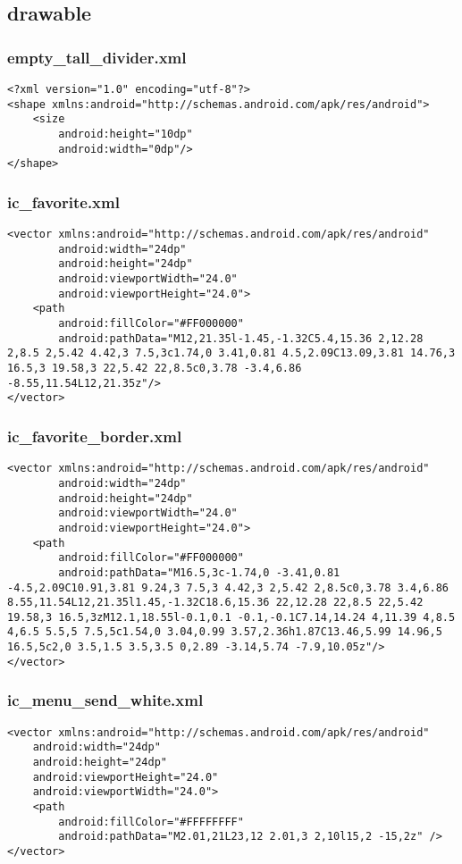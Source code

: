 \subsection*{drawable}
\subsubsection*{empty\_tall\_divider.xml}
\begin{lstlisting}
<?xml version="1.0" encoding="utf-8"?>
<shape xmlns:android="http://schemas.android.com/apk/res/android">
    <size
        android:height="10dp"
        android:width="0dp"/>
</shape>
\end{lstlisting}

\subsubsection*{ic\_favorite.xml}
\begin{lstlisting}
<vector xmlns:android="http://schemas.android.com/apk/res/android"
        android:width="24dp"
        android:height="24dp"
        android:viewportWidth="24.0"
        android:viewportHeight="24.0">
    <path
        android:fillColor="#FF000000"
        android:pathData="M12,21.35l-1.45,-1.32C5.4,15.36 2,12.28 2,8.5 2,5.42 4.42,3 7.5,3c1.74,0 3.41,0.81 4.5,2.09C13.09,3.81 14.76,3 16.5,3 19.58,3 22,5.42 22,8.5c0,3.78 -3.4,6.86 -8.55,11.54L12,21.35z"/>
</vector>
\end{lstlisting}

\subsubsection*{ic\_favorite\_border.xml}
\begin{lstlisting}
<vector xmlns:android="http://schemas.android.com/apk/res/android"
        android:width="24dp"
        android:height="24dp"
        android:viewportWidth="24.0"
        android:viewportHeight="24.0">
    <path
        android:fillColor="#FF000000"
        android:pathData="M16.5,3c-1.74,0 -3.41,0.81 -4.5,2.09C10.91,3.81 9.24,3 7.5,3 4.42,3 2,5.42 2,8.5c0,3.78 3.4,6.86 8.55,11.54L12,21.35l1.45,-1.32C18.6,15.36 22,12.28 22,8.5 22,5.42 19.58,3 16.5,3zM12.1,18.55l-0.1,0.1 -0.1,-0.1C7.14,14.24 4,11.39 4,8.5 4,6.5 5.5,5 7.5,5c1.54,0 3.04,0.99 3.57,2.36h1.87C13.46,5.99 14.96,5 16.5,5c2,0 3.5,1.5 3.5,3.5 0,2.89 -3.14,5.74 -7.9,10.05z"/>
</vector>
\end{lstlisting}

\subsubsection*{ic\_menu\_send\_white.xml}
\begin{lstlisting}
<vector xmlns:android="http://schemas.android.com/apk/res/android"
    android:width="24dp"
    android:height="24dp"
    android:viewportHeight="24.0"
    android:viewportWidth="24.0">
    <path
        android:fillColor="#FFFFFFFF"
        android:pathData="M2.01,21L23,12 2.01,3 2,10l15,2 -15,2z" />
</vector>
\end{lstlisting}

